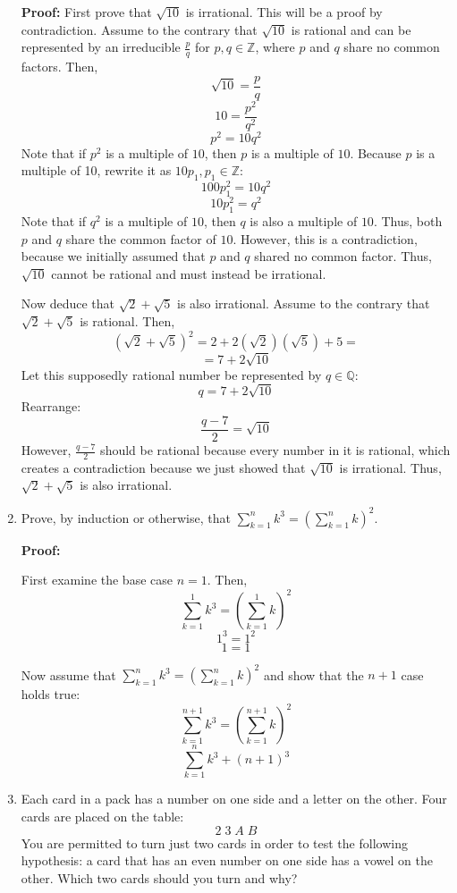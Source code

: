 \documentclass[11pt]{article}
\begin{document}
\begin{enumerate}
\bigskip 
\textbf{Proof: } First prove that $\sqrt{10}$ is irrational. This will be a proof by contradiction. Assume to the contrary that $\sqrt{10}$ is rational and can be represented by an irreducible $\frac{p}{q}$ for $p,q \in \mathbb{Z}$, where $p$ and $q$ share no common factors. Then, 
\[\sqrt{10} = \frac{p}{q} \]
\[10 = \frac{p^2}{q^2}\]
\[p^2 = 10q^2 \]
 Note that if $p^2$ is a multiple of $10$, then $p$ is a multiple of $10$. Because $p$ is a multiple of 10, rewrite it as $10p_1, p_1 \in \mathbb{Z}$: 
\[100p_1 ^2 = 10 q^2\]
\[10p_1^2 = q^2   \]
Note that if $q^2$ is a multiple of $10$, then $q$ is also a multiple of $10$. Thus, both $p$ and $q$ share the common factor of $10$.
However, this is a contradiction, because we initially assumed that $p$ and $q$ shared no common factor. Thus, $\sqrt{10}$ cannot be rational and must instead be irrational. 

Now deduce that $\sqrt{2} + \sqrt{5}$ is also irrational. Assume to the contrary that $\sqrt{2} + \sqrt{5}$ is rational. Then, 
\[(\sqrt{2} + \sqrt{5})^2  = 2 + 2(\sqrt{2})(\sqrt{5}) + 5 = \]
\[ = 7 + 2\sqrt{10}\]
Let this supposedly rational number be represented by $q \in \mathbb{Q}$:
\[q = 7 + 2\sqrt{10}\]
Rearrange:
\[\frac{q-7}{2} = \sqrt{10}\]
However, $\frac{q-7}{2}$ should be rational because every number in it is rational, which creates a contradiction because we just showed that $\sqrt{10}$ is irrational. Thus, $\sqrt{2} + \sqrt{5}$ is also irrational.

\bigskip
\rightline{$\Box$}
\item
Prove, by induction or otherwise, that $\sum_{k=1}^n k^3 = \left(\sum_{k=1}^n k\right)^2$.

\bigskip\textbf{Proof: }

First examine the base case $n = 1$. Then, 
\[ \sum_{k=1}^1 k^3 = \left(\sum_{k=1}^1 k\right)^2 \]
\[ 1^3 = 1^2\]
\[ 1= 1\]

Now assume that $\sum_{k=1}^n k^3 = \left(\sum_{k=1}^n k\right)^2$ and show that the $n+1$ case holds true: 
\[ \sum_{k=1}^{n+1} k^3 = \left(\sum_{k=1}^{n+1} k\right)^2 \]
\[ \sum_{k=1}^{n} k^3 + (n+1)^3\]
\item
Each card in a pack has a number on one side and a letter on the other. Four cards are
placed on the table:
\[ \boxed{2} \; \boxed{3} \; \boxed{A} \; \boxed{B}\]
You are permitted to turn just two cards in order to test the following hypothesis: a card that
has an even number on one side has a vowel on the other. Which two cards should you turn and why? 


\end{enumerate}
\end{document}
